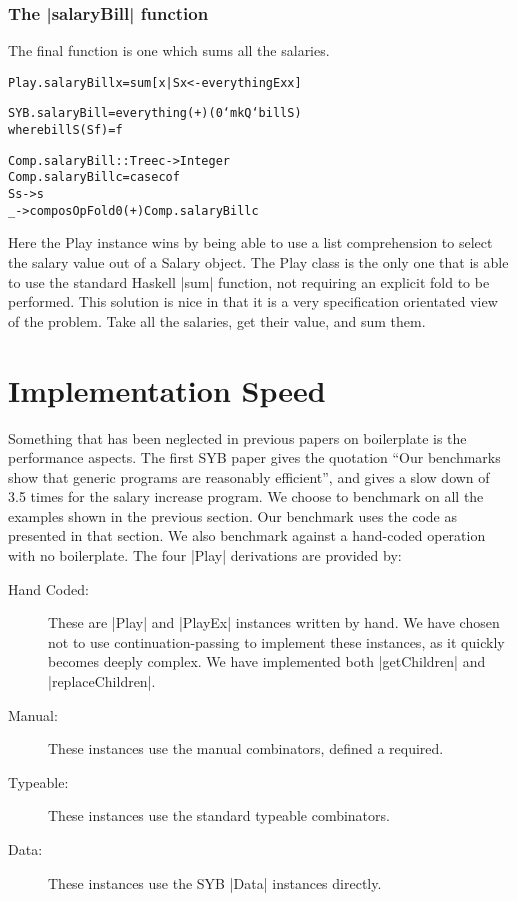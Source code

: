\documentclass[preprint]{sigplanconf}
\newenvironment{code}{\begin{alltt}\small}{\end{alltt}}
\begin{document}
\subsubsection{The |salaryBill| function}

The final function is one which sums all the salaries.

\begin{code}
Play.salaryBill x = sum [x | S x <- everythingEx x]

SYB.salaryBill = everything (+) (0 `mkQ` billS)
   where billS (S f) = f

Comp.salaryBill :: Tree c -> Integer
Comp.salaryBill c = case c of
    S s -> s
    _ -> composOpFold 0 (+) Comp.salaryBill c
\end{code}

Here the Play instance wins by being able to use a list comprehension to select the salary value out of a Salary object. The Play class is the only one that is able to use the standard Haskell |sum| function, not requiring an explicit fold to be performed. This solution is nice in that it is a very specification orientated view of the problem. Take all the salaries, get their value, and sum them.


\section{Implementation Speed}

Something that has been neglected in previous papers on boilerplate is the performance aspects. The first SYB paper gives the quotation ``Our benchmarks show that generic programs are reasonably efficient'', and gives a slow down of 3.5 times for the salary increase program. We choose to benchmark on all the examples shown in the previous section. Our benchmark uses the code as presented in that section. We also benchmark against a hand-coded operation with no boilerplate. The four |Play| derivations are provided by:

\begin{description}
\item[Hand Coded:] These are |Play| and |PlayEx| instances written by hand. We have chosen not to use continuation-passing to implement these instances, as it quickly becomes deeply complex. We have implemented both |getChildren| and |replaceChildren|.
\item[Manual:] These instances use the manual combinators, defined a required.
\item[Typeable:] These instances use the standard typeable combinators.
\item[Data:] These instances use the SYB |Data| instances directly.
\end{description}
\end{document}

